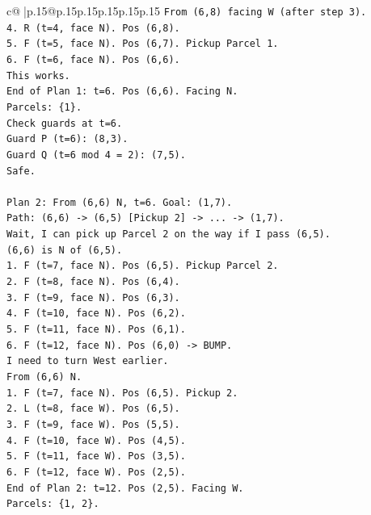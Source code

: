 \documentclass{article}
\begin{document}
{\begin{supertabular}{c@{$\;$}|p{.15\linewidth}@{}p{.15\linewidth}p{.15\linewidth}p{.15\linewidth}p{.15\linewidth}p{.15\linewidth}}
{{{\texttt{From (6,8) facing W (after step 3).} \\
\texttt{4. R (t=4, face N). Pos (6,8).} \\
\texttt{5. F (t=5, face N). Pos (6,7). Pickup Parcel 1.} \\
\texttt{6. F (t=6, face N). Pos (6,6).} \\
\texttt{This works.} \\
\texttt{End of Plan 1: t=6. Pos (6,6). Facing N.} \\
\texttt{Parcels: \{1\}.} \\
\texttt{Check guards at t=6.} \\
\texttt{Guard P (t=6): (8,3).} \\
\texttt{Guard Q (t=6 mod 4 = 2): (7,5).} \\
\texttt{Safe.} \\
\\ 
\texttt{Plan 2: From (6,6) N, t=6. Goal: (1,7).} \\
\texttt{Path: (6,6) {-}> (6,5) {[}Pickup 2{]} {-}> ... {-}> (1,7).} \\
\texttt{Wait, I can pick up Parcel 2 on the way if I pass (6,5).} \\
\texttt{(6,6) is N of (6,5).} \\
\texttt{1. F (t=7, face N). Pos (6,5). Pickup Parcel 2.} \\
\texttt{2. F (t=8, face N). Pos (6,4).} \\
\texttt{3. F (t=9, face N). Pos (6,3).} \\
\texttt{4. F (t=10, face N). Pos (6,2).} \\
\texttt{5. F (t=11, face N). Pos (6,1).} \\
\texttt{6. F (t=12, face N). Pos (6,0) {-}> BUMP.} \\
\texttt{I need to turn West earlier.} \\
\texttt{From (6,6) N.} \\
\texttt{1. F (t=7, face N). Pos (6,5). Pickup 2.} \\
\texttt{2. L (t=8, face W). Pos (6,5).} \\
\texttt{3. F (t=9, face W). Pos (5,5).} \\
\texttt{4. F (t=10, face W). Pos (4,5).} \\
\texttt{5. F (t=11, face W). Pos (3,5).} \\
\texttt{6. F (t=12, face W). Pos (2,5).} \\
\texttt{End of Plan 2: t=12. Pos (2,5). Facing W.} \\
\texttt{Parcels: \{1, 2\}.} \\
}}}
\end{supertabular}}
\end{document}
